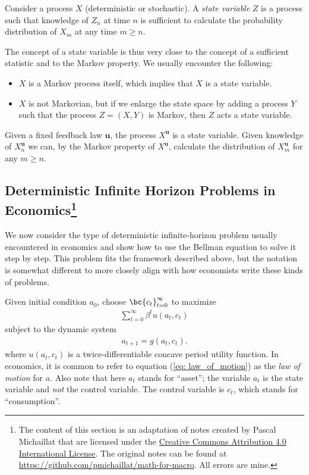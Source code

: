 \documentclass[\topdir/lecture\_notes.tex]{subfiles}
\begin{document}
\begin{defn}
Consider a process $X$ (deterministic or stochastic). A \emph{state variable} $Z$ is a process such that knowledge of $Z_{n}$ at time $n$ is sufficient to calculate the probability distribution of $X_{m}$ at any time $m \geq n$.
\end{defn}
The concept of a state variable is thus very close to the concept of a sufficient statistic and to the Markov property. We usually encounter the following:
\begin{itemize}
  \item $X$ is a Markov process itself, which implies that $X$ is a state variable.
  \item $X$ is not Markovian, but if we enlarge the state space by adding a process $Y$ such that the process $Z=(X, Y)$ is Markov, then $Z$ acts a state variable.
\end{itemize}
Given a fixed feedback law $\mathbf{u}$, the process $X^{\mathbf{u}}$ is a state variable. Given knowledge of $X_{n}^{\mathbf{u}}$ we can, by the Markov property of $X^{\mathbf{u}}$, calculate the distribution of $X_{m}^{\mathbf{u}}$ for any $m \geq n$.



\subsection[Deterministic Infinite Horizon Problems in Economics]{Deterministic Infinite Horizon Problems in Economics\footnote{The content of this section is an adaptation of notes created by Pascal Michaillat that are licensed under the \href{https://creativecommons.org/licenses/by/4.0/}{Creative Commons Attribution 4.0 International License}. The original notes can be found at \href{https://github.com/pmichaillat/math-for-macro}{https://github.com/pmichaillat/math-for-macro}. All errors are mine.}}

We now consider the type of deterministic infinite-horizon problem usually encountered in economics and show how to use the Bellman equation to solve it step by step. This problem fits the framework described above, but the notation is somewhat different to more closely align with how economists write these kinds of problems.

Given initial condition $a_{0}$, choose $\bc{c_{t}}_{t=0}^{\infty}$ to maximize
\begin{align*}
\sum_{t=0}^{\infty}\beta^{t}u(a_{t},c_{t})
\end{align*}
subject to the dynamic system
\begin{align}
a_{t+1}=g(a_{t},c_{t}).\label{eq: law_of_motion}
\end{align}
where $u(a_{t},c_{t})$ is a twice-differentiable concave period utility function. In economics,
it is common to refer to equation (\ref{eq: law_of_motion}) as the \emph{law of motion} for $a$. Also note that here $a_t$ stands for ``asset''; the variable $a_t$ is the state variable and \textit{not} the control variable. The control variable is $c_t$, which stands for ``consumption''.
\end{document}
